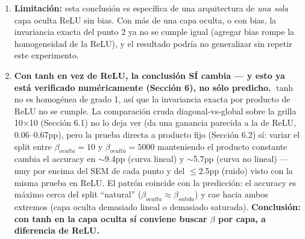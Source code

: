\documentclass[11pt]{article}
\begin{document}
\begin{enumerate}
\item \textbf{Limitación:} esta conclusión es específica de una arquitectura de \emph{una sola} capa oculta ReLU sin bias. Con más de una capa oculta, o con bias, la invariancia exacta del punto 2 ya no se cumple igual (agregar bias rompe la homogeneidad de la ReLU), y el resultado podría no generalizar sin repetir este experimento.

\item \textbf{Con tanh en vez de ReLU, la conclusión SÍ cambia — y esto ya está verificado numéricamente (Sección 6), no sólo predicho.} $\tanh$ no es homogénea de grado 1, así que la invariancia exacta por producto de ReLU no se cumple. La comparación cruda diagonal-vs-global sobre la grilla 10$\times$10 (Sección 6.1) no lo deja ver (da una ganancia parecida a la de ReLU, 0.06--0.67pp), pero la prueba directa a producto fijo (Sección 6.2) sí: variar el split entre $\beta_{oculta}=10$ y $\beta_{oculta}=5000$ manteniendo el producto constante cambia el accuracy en $\sim$9.4pp (curva lineal) y $\sim$5.7pp (curva no lineal) — muy por encima del SEM de cada punto y del $\le$2.5pp (ruido) visto con la misma prueba en ReLU. El patrón coincide con la predicción: el accuracy es máximo cerca del split ``natural'' ($\beta_{oculta}\approx\beta_{salida}$) y cae hacia ambos extremos (capa oculta demasiado lineal o demasiado saturada). \textbf{Conclusión: con tanh en la capa oculta sí conviene buscar $\beta$ por capa, a diferencia de ReLU.}

\end{enumerate}
\end{document}

